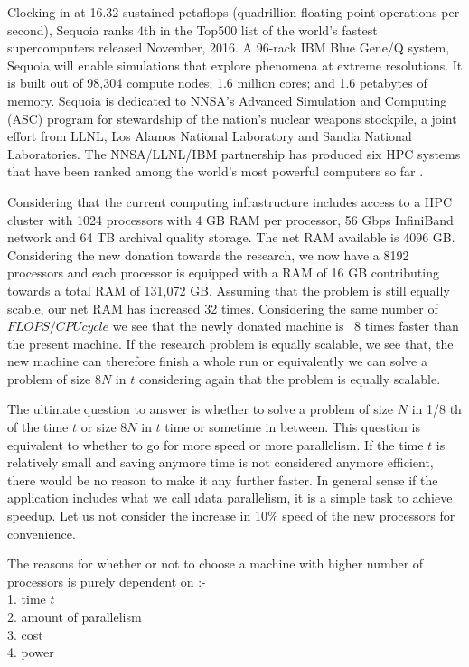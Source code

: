 \documentclass[fleqn,letterpaper,12pt]{report}
\begin{document}
Clocking in at 16.32 sustained petaflops (quadrillion floating point operations per second), Sequoia ranks 4th in the Top500 list of the world's fastest supercomputers released November, 2016. A 96-rack IBM Blue Gene/Q system, Sequoia will enable simulations that explore phenomena at extreme resolutions. It is built out of 98,304 compute nodes; 1.6 million cores; and 1.6 petabytes of memory. Sequoia is dedicated to NNSA's Advanced Simulation and Computing (ASC) program for stewardship of the nation's nuclear weapons stockpile, a joint effort from LLNL, Los Alamos National Laboratory and Sandia National Laboratories. The NNSA/LLNL/IBM partnership has produced six HPC systems that have been ranked among the world's most powerful computers so far \cite{sequoia}. 
\newpage
{}
{}
\problem
Considering that the current computing infrastructure includes access to a HPC cluster with 1024 processors with 4 GB RAM per processor, 56 Gbps InfiniBand network and 64 TB archival quality storage. The net RAM available is 4096 GB. Considering the new donation towards the research, we now have a 8192 processors and each processor is equipped with a RAM of 16 GB contributing towards a total RAM of 131,072 GB. Assuming that the problem is still equally scable, our net RAM has increased 32 times. 
Considering the same number of $FLOPS/CPU cycle$ we see that the newly donated machine is ~8 times faster than the present machine. If the research problem is equally scalable, we see that, the new machine can therefore finish a whole run or equivalently we can solve a problem of size $8N$ in $t$ considering again that the problem is equally scalable.

The ultimate question to answer is whether to solve a problem of size $N$ in 1/8 th of the time $t$ or size $8N$ in $t$ time or sometime in between. This question is equivalent to whether to go for more speed or more parallelism. If the time $t$ is relatively small and saving anymore time is not considered anymore efficient, there would be no reason to make it any further faster. In general sense if the application includes what we call \i{data parallelism}, it is a simple task to achieve speedup. Let us not consider the increase in 10\% speed of the new processors for convenience. 

The reasons for whether or not to choose a machine with higher number of processors is purely dependent on :-\\
1. time $t$ \\
2. amount of parallelism \\
3. cost \\
4. power 
\end{document}
